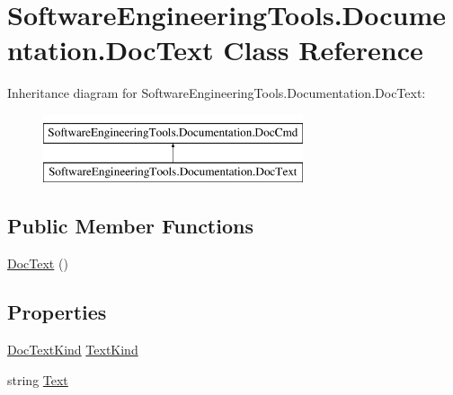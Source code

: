 \hypertarget{class_software_engineering_tools_1_1_documentation_1_1_doc_text}{\section{Software\+Engineering\+Tools.\+Documentation.\+Doc\+Text Class Reference}
\label{class_software_engineering_tools_1_1_documentation_1_1_doc_text}
}
Inheritance diagram for Software\+Engineering\+Tools.\+Documentation.\+Doc\+Text\+:\begin{figure}[H]
\begin{center}
\leavevmode
\includegraphics[height=2.000000cm]{class_software_engineering_tools_1_1_documentation_1_1_doc_text}
\end{center}
\end{figure}
\subsection*{Public Member Functions}
\begin{DoxyCompactItemize}
\item 
\hyperlink{class_software_engineering_tools_1_1_documentation_1_1_doc_text_a4ee2262ff9fece2948d9ea0c1764787b}{Doc\+Text} ()
\end{DoxyCompactItemize}
\subsection*{Properties}
\begin{DoxyCompactItemize}
\item 
\hyperlink{namespace_software_engineering_tools_1_1_documentation_a3ea05a36a124627c06555e31c2a884c2}{Doc\+Text\+Kind} \hyperlink{class_software_engineering_tools_1_1_documentation_1_1_doc_text_a048129017e00ecdf66e0e9a698a45638}{Text\+Kind}
\item 
string \hyperlink{class_software_engineering_tools_1_1_documentation_1_1_doc_text_aa4692730973fd11f41c63566ddc20f72}{Text}
\end{DoxyCompactItemize}


